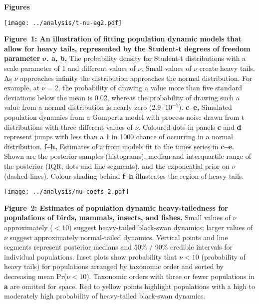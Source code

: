 \clearpage

\textbf{Figures}

\begin{center}
\texttt{[image: ../analysis/t-nu-eg2.pdf]}
\end{center}

\textbf{Figure~1: An illustration of fitting population dynamic models that allow for heavy tails, represented by the Student-t degrees of freedom parameter} \(\mathbf{\nu}\)\textbf{. a, b,} The probability density for Student-t distributions with a scale parameter of 1 and different values of \(\nu\). Small values of \(\nu\) create heavy tails. As \(\nu\) approaches infinity the distribution approaches the normal distribution. For example, at \(\nu = 2\), the probability of drawing a value more than five standard deviations below the mean is 0.02, whereas the probability of drawing such a value from a normal distribution is nearly zero (\(2.9 \cdot 10^{- 7}\)). \textbf{c--e,} Simulated population dynamics from a Gompertz model with process noise drawn from t distributions with three different values of \(\nu\). Coloured dots in panels \textbf{c} and \textbf{d} represent jumps with less than a 1 in 1000 chance of occurring in a normal distribution. \textbf{f--h,} Estimates of \(\nu\) from models fit to the times series in \textbf{c--e}. Shown are the posterior samples (histograms), median and interquartile range of the posterior (IQR, dots and line segments), and the exponential prior on \(\nu\) (dashed lines). Colour shading behind \textbf{f--h} illustrates the region of heavy tails.

\clearpage

\begin{center}
\texttt{[image: ../analysis/nu-coefs-2.pdf]}
\end{center}

\textbf{Figure~2: Estimates of population dynamic heavy-tailedness for populations of birds, mammals, insects, and fishes.} Small values of \(\nu\) approximately (\(< 10\)) suggest heavy-tailed black-swan dynamics; larger values of \(\nu\) suggest approximately normal-tailed dynamics. Vertical points and line segments represent posterior medians and 50\% / 90\% credible intervals for individual populations. Inset plots show probability that \(\nu < 10\) (probability of heavy tails) for populations arranged by taxonomic order and sorted by decreasing mean Pr(\(\nu < 10\)). Taxonomic orders with three or fewer populations in \textbf{a} are omitted for space. Red to yellow points highlight populations with a high to moderately high probability of heavy-tailed black-swan dynamics.

